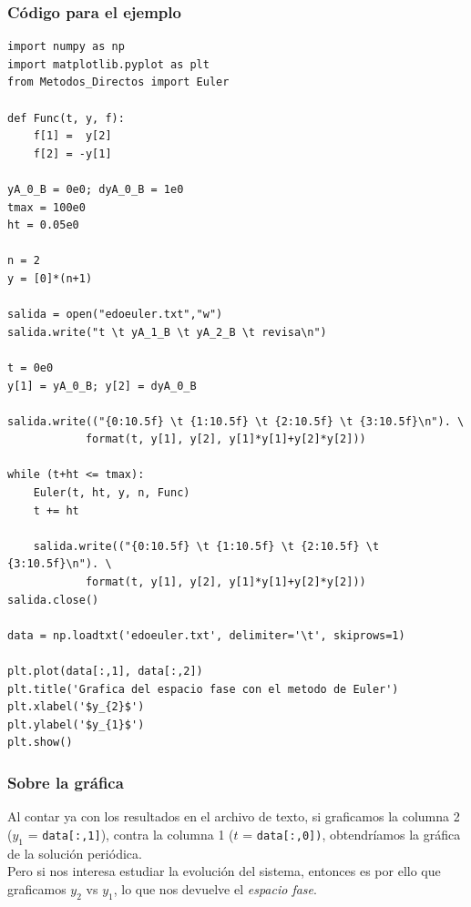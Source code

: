 \begin{frame}
\frametitle{Código para el ejemplo}
\begin{lstlisting}[caption=Código para resolver el ejercicio con el método de Euler, style=codigopython]
import numpy as np
import matplotlib.pyplot as plt
from Metodos_Directos import Euler

def Func(t, y, f):
    f[1] =  y[2]
    f[2] = -y[1]

yA_0_B = 0e0; dyA_0_B = 1e0
tmax = 100e0
ht = 0.05e0

n = 2
y = [0]*(n+1)

salida = open("edoeuler.txt","w")
salida.write("t \t yA_1_B \t yA_2_B \t revisa\n")

t = 0e0
y[1] = yA_0_B; y[2] = dyA_0_B

salida.write(("{0:10.5f} \t {1:10.5f} \t {2:10.5f} \t {3:10.5f}\n"). \
            format(t, y[1], y[2], y[1]*y[1]+y[2]*y[2]))

while (t+ht <= tmax):
    Euler(t, ht, y, n, Func)
    t += ht

    salida.write(("{0:10.5f} \t {1:10.5f} \t {2:10.5f} \t {3:10.5f}\n"). \
            format(t, y[1], y[2], y[1]*y[1]+y[2]*y[2]))
salida.close()

data = np.loadtxt('edoeuler.txt', delimiter='\t', skiprows=1)

plt.plot(data[:,1], data[:,2])
plt.title('Grafica del espacio fase con el metodo de Euler')
plt.xlabel('$y_{2}$')
plt.ylabel('$y_{1}$')
plt.show()
\end{lstlisting}
\end{frame}
\begin{frame}[fragile]
\frametitle{Sobre la gráfica}
Al contar ya con los resultados en el archivo de texto, si graficamos la columna 2 ($y_{1}$ = \verb|data[:,1]|), contra la columna 1 ($t$ = \verb|data[:,0])|, obtendríamos la gráfica de la solución periódica.
\\
\bigskip
Pero si nos interesa estudiar la evolución del sistema, entonces es por ello que graficamos $y_{2}$ vs $y_{1}$, lo que nos devuelve el \emph{espacio fase}.
\end{frame}
